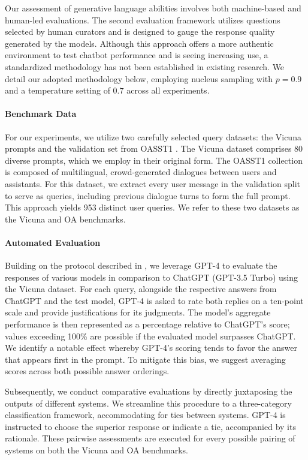 Our assessment of generative language abilities involves both machine-based and human-led evaluations. The second evaluation framework utilizes questions selected by human curators and is designed to gauge the response quality generated by the models. Although this approach offers a more authentic environment to test chatbot performance and is seeing increasing use, a standardized methodology has not been established in existing research. We detail our adopted methodology below, employing nucleus sampling with $p=0.9$ and a temperature setting of $0.7$ across all experiments.

\paragraph{Benchmark Data} For our experiments, we utilize two carefully selected query datasets: the Vicuna prompts \citep{vicuna2023} and the validation set from OASST1 \citep{kopf2023openassistant}. The Vicuna dataset comprises 80 diverse prompts, which we employ in their original form. The OASST1 collection is composed of multilingual, crowd-generated dialogues between users and assistants. For this dataset, we extract every user message in the validation split to serve as queries, including previous dialogue turns to form the full prompt. This approach yields 953 distinct user queries. We refer to these two datasets as the Vicuna and OA benchmarks.

\paragraph{Automated Evaluation} Building on the protocol described in \citet{vicuna2023}, we leverage GPT-4 to evaluate the responses of various models in comparison to ChatGPT (GPT-3.5 Turbo) using the Vicuna dataset. For each query, alongside the respective answers from ChatGPT and the test model, GPT-4 is asked to rate both replies on a ten-point scale and provide justifications for its judgments. The model's aggregate performance is then represented as a percentage relative to ChatGPT’s score; values exceeding 100\% are possible if the evaluated model surpasses ChatGPT. We identify a notable effect whereby GPT-4’s scoring tends to favor the answer that appears first in the prompt. To mitigate this bias, we suggest averaging scores across both possible answer orderings.

Subsequently, we conduct comparative evaluations by directly juxtaposing the outputs of different systems. We streamline this procedure to a three-category classification framework, accommodating for ties between systems. GPT-4 is instructed to choose the superior response or indicate a tie, accompanied by its rationale. These pairwise assessments are executed for every possible pairing of systems on both the Vicuna and OA benchmarks.

